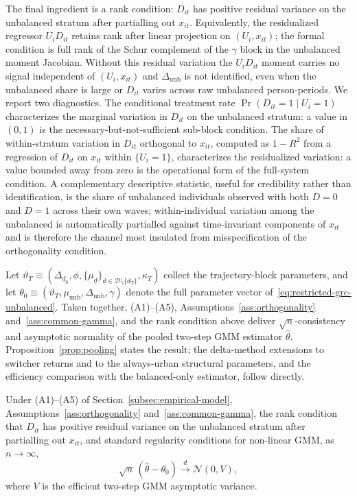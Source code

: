 The final ingredient is a rank condition: $D_{it}$ has positive residual variance on the unbalanced stratum after partialling out $x_{it}$.
Equivalently, the residualized regressor $U_i D_{it}$ retains rank after linear projection on $(U_i, x_{it})$; the formal condition is full rank of the Schur complement of the $\gamma$ block in the unbalanced moment Jacobian.
Without this residual variation the $U_iD_{it}$ moment carries no signal independent of $(U_i, x_{it})$ and $\Delta_{\mathrm{unb}}$ is not identified, even when the unbalanced share is large or $D_{it}$ varies across raw unbalanced person-periods.
We report two diagnostics.
The conditional treatment rate $\Pr(D_{it}=1\mid U_i=1)$ characterizes the marginal variation in $D_{it}$ on the unbalanced stratum: a value in $(0,1)$ is the necessary-but-not-sufficient sub-block condition.
The share of within-stratum variation in $D_{it}$ orthogonal to $x_{it}$, computed as $1-R^2$ from a regression of $D_{it}$ on $x_{it}$ within $\{U_i=1\}$, characterizes the residualized variation: a value bounded away from zero is the operational form of the full-system condition.
A complementary descriptive statistic, useful for credibility rather than identification, is the share of unbalanced individuals observed with both $D=0$ and $D=1$ across their own waves; within-individual variation among the unbalanced is automatically partialled against time-invariant components of $x_{it}$ and is therefore the channel most insulated from misspecification of the orthogonality condition.

Let $\vartheta_T \equiv (\Delta_{\underline d_0},\phi,\{\mu_{\underline d}\}_{\underline d \in \mathcal D\setminus\{d_T\}},\kappa_T)$ collect the trajectory-block parameters, and let $\theta_0 \equiv (\vartheta_T,\mu_{\mathrm{unb}},\Delta_{\mathrm{unb}},\gamma)$ denote the full parameter vector of~\eqref{eq:restricted-grc-unbalanced}.
Taken together, (A1)--(A5), Assumptions~\ref{ass:orthogonality} and~\ref{ass:common-gamma}, and the rank condition above deliver $\sqrt n$-consistency and asymptotic normality of the pooled two-step GMM estimator $\hat\theta$.
Proposition~\ref{prop:pooling} states the result; the delta-method extensions to switcher returns and to the always-urban structural parameters, and the efficiency comparison with the balanced-only estimator, follow directly.

\begin{proposition}
\label{prop:pooling}
Under (A1)--(A5) of Section~\ref{subsec:empirical-model}, Assumptions~\ref{ass:orthogonality} and~\ref{ass:common-gamma}, the rank condition that $D_{it}$ has positive residual variance on the unbalanced stratum after partialling out $x_{it}$, and standard regularity conditions for non-linear GMM, as $n\to\infty$,
\[
\sqrt n\,(\hat\theta - \theta_0) \xrightarrow{d} \mathcal N(0,V),
\]
where $V$ is the efficient two-step GMM asymptotic variance.
\end{proposition}

